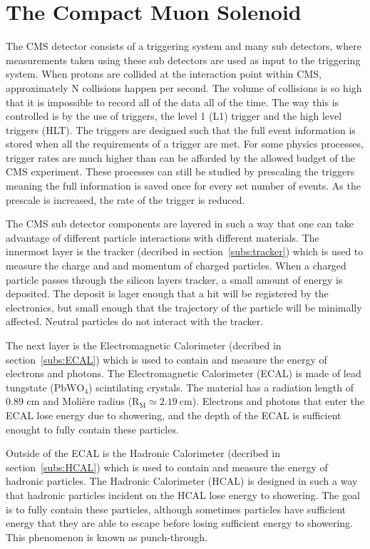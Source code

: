 \section{The Compact Muon Solenoid}
The CMS detector consists of a triggering system and many sub detectors,
where measurements taken using these sub detectors are used as input to the triggering system.
When protons are collided at the interaction point within CMS, approximately N collisions happen per second.
The volume of collisions is so high that it is impossible to record all of the data all of the time.
The way this is controlled is by the use of triggers, the level 1 (L1) trigger and the high level triggers (HLT).
The triggers are designed such that the full event information is stored when all the requirements of a trigger are met.
For some physics processes, trigger rates are much higher than can be afforded by the allowed budget of the CMS experiment.
These processes can still be studied by prescaling the triggers meaning the full information is saved once for every set number of events.
As the prescale is increased, the rate of the trigger is reduced.

The CMS sub detector components are layered in such a way that one can take advantage of different particle interactions with different materials.
The innermost layer is the tracker (decribed in section~\ref{subs:tracker}) which is used to measure the charge and and momentum of charged particles.
When a charged particle passes through the silicon layers tracker, a small amount of energy is deposited.
The deposit is lager enough that a hit will be registered by the electronics, but small enough that the trajectory of the particle will be minimally affected.
Neutral particles do not interact with the tracker.

The next layer is the Electromagnetic Calorimeter (decribed in section~\ref{subs:ECAL}) which is used to contain and measure the energy of electrons and photons.
The Electromagnetic Calorimeter (ECAL) is made of lead tungstate ($\mathrm{PbWO_{4}}$) scintilating crystals.
The material has a radiation length of 0.89 cm and Moli\`ere radius ($\mathrm{R_{M} \simeq 2.19~cm}$).
Electrons and photons that enter the ECAL lose energy due to showering, and the depth of the ECAL is sufficient enought to fully contain these particles.

Outside of the ECAL is the Hadronic Calorimeter (decribed in section~\ref{subs:HCAL}) which is used to contain and measure the energy of hadronic particles.
The Hadronic Calorimeter (HCAL) is designed in such a way that hadronic particles incident on the HCAL lose energy to showering.
The goal is to fully contain these particles, although sometimes particles have sufficient energy that they are able to escape before losing sufficient energy to showering.
This phenomenon is known as punch-through.

